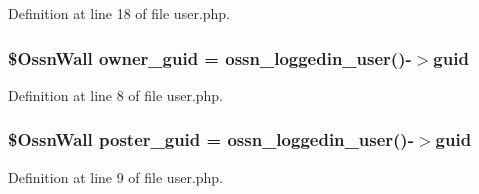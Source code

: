 Definition at line 18 of file user.\+php.

\subsubsection[{\texorpdfstring{owner\+\_\+guid}{owner_guid}}]{\setlength{\rightskip}{0pt plus 5cm}\${\bf Ossn\+Wall} owner\+\_\+guid = {\bf ossn\+\_\+loggedin\+\_\+user}()-\/$>$guid}\hypertarget{user_8php_a307051fefc937afd02c509c55646f50b}{}\label{user_8php_a307051fefc937afd02c509c55646f50b}


Definition at line 8 of file user.\+php.

\subsubsection[{\texorpdfstring{poster\+\_\+guid}{poster_guid}}]{\setlength{\rightskip}{0pt plus 5cm}\${\bf Ossn\+Wall} poster\+\_\+guid = {\bf ossn\+\_\+loggedin\+\_\+user}()-\/$>$guid}\hypertarget{user_8php_a24eb7b66e353d8983f6f2af979250671}{}\label{user_8php_a24eb7b66e353d8983f6f2af979250671}


Definition at line 9 of file user.\+php.

